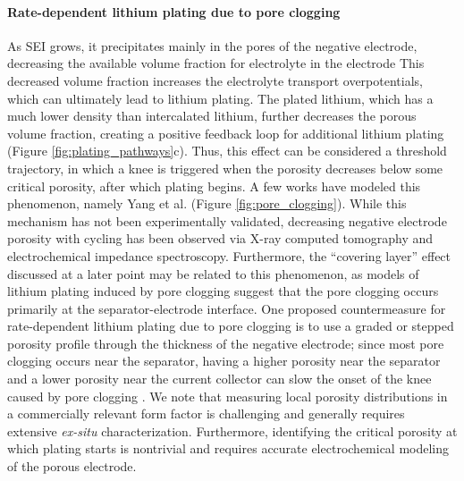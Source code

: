 \documentclass[journal=jpclcd,manuscript=article]{achemso}
\begin{document}
\paragraph{Rate-dependent lithium plating due to pore clogging}
As SEI grows, it precipitates mainly in the pores of the negative electrode, decreasing the available volume fraction for electrolyte in the electrode \cite{sikha_effect_2004}
This decreased volume fraction increases the electrolyte transport overpotentials, which can ultimately lead to lithium plating.
The plated lithium, which has a much lower density than intercalated lithium, further decreases the porous volume fraction, creating a positive feedback loop for additional lithium plating\cite{yang_modeling_2017} (Figure \ref{fig:plating_pathways}c).
Thus, this effect can be considered a threshold trajectory, in which a knee is triggered when the porosity decreases below some critical porosity, after which plating begins.
A few works have modeled this phenomenon\cite{yang_modeling_2017, muller_model-based_2019, keil_electrochemical_2020, atalay_theory_2020}{}, namely Yang et al.\cite{yang_modeling_2017} (Figure \ref{fig:pore_clogging}).
While this mechanism has not been experimentally validated, decreasing negative electrode porosity with cycling has been observed via X-ray computed tomography\cite{frisco_understanding_2016, rahe_nanoscale_2019} and electrochemical impedance spectroscopy\cite{klett_uneven_2015, petzl_lithium_2015, sarasketa-zabala_understanding_2015, sarasketa-zabala_cycle_2015}{}.
Furthermore, the ``covering layer'' effect discussed at a later point may be related to this phenomenon, as models of lithium plating induced by pore clogging suggest that the pore clogging occurs primarily at the separator-electrode interface.\cite{yang_modeling_2017}
One proposed countermeasure for rate-dependent lithium plating due to pore clogging is to use a graded or stepped porosity profile through the thickness of the negative electrode; since most pore clogging occurs near the separator, having a higher porosity near the separator and a lower porosity near the current collector can slow the onset of the knee caused by pore clogging \cite{muller_model-based_2019}.
We note that measuring local porosity distributions in a commercially relevant form factor is challenging and generally requires extensive \textit{ex-situ} characterization. Furthermore, identifying the critical porosity at which plating starts is nontrivial and requires accurate electrochemical modeling of the porous electrode.
\end{document}
